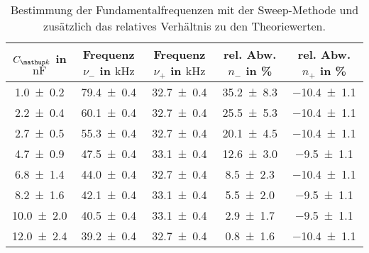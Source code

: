 \begin{table} 
\centering 
\caption{Bestimmung der Fundamentalfrequenzen mit der Sweep-Methode und zusätzlich das relatives Verhältnis zu den Theoriewerten.} 
\label{tab:teilc_schwingungen_prak_theo} 
\begin{tabular}{S S S S S } 
\toprule  
{$C\ua{k}$ in $\si{\nano\farad}$} & {Frequenz $\nu_-$ in $\si{\kilo\hertz}$} & {Frequenz $\nu_+$ in $\si{\kilo\hertz}$ }& {rel. Abw. $n_{-}$ in \%} & {rel. Abw. $n_+$ in \%}  \\ 
\midrule  
 \num{1.0\pm0.2} & \num{79.4\pm0.4} & \num{32.7\pm0.4} & \num{35.2\pm8.3} & \num{-10.4\pm1.1}\\ 
\num{2.2\pm0.4} & \num{60.1\pm0.4} & \num{32.7\pm0.4} & \num{25.5\pm5.3} & \num{-10.4\pm1.1}\\ 
\num{2.7\pm0.5} & \num{55.3\pm0.4} & \num{32.7\pm0.4} & \num{20.1\pm4.5} & \num{-10.4\pm1.1}\\ 
\num{4.7\pm0.9} & \num{47.5\pm0.4} & \num{33.1\pm0.4} & \num{12.6\pm3.0} & \num{-9.5\pm1.1}\\ 
\num{6.8\pm1.4} & \num{44.0\pm0.4} & \num{32.7\pm0.4} & \num{8.5\pm2.3} & \num{-10.4\pm1.1}\\ 
\num{8.2\pm1.6} & \num{42.1\pm0.4} & \num{33.1\pm0.4} & \num{5.5\pm2.0} & \num{-9.5\pm1.1}\\ 
\num{10.0\pm2.0} & \num{40.5\pm0.4} & \num{33.1\pm0.4} & \num{2.9\pm1.7} & \num{-9.5\pm1.1}\\ 
\num{12.0\pm2.4} & \num{39.2\pm0.4} & \num{32.7\pm0.4} & \num{0.8\pm1.6} & \num{-10.4\pm1.1}\\ 
\bottomrule 
\end{tabular} 
\end{table}

